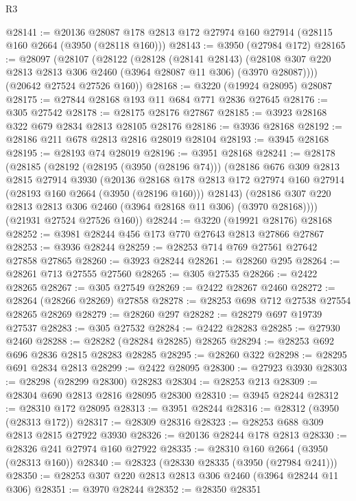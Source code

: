 \begin{lexlean}{R3}
\begin{coremodule}
@28141 := @20136 @28087 @178 @2813 @172 @27974 @160 @27914 (@28115 @160 @2664 (@3950 (@28118 @160)))
@28143 := @3950 (@27984 @172)
@28165 := @28097
    (@28107
      (@28122
        (@28128
          (@28141 @28143)
          (@28108 @307 @220 @2813 @2813 @306 @2460 (@3964 @28087 @11 @306) (@3970 @28087))))
      (@20642 @27524 @27526 @160))
@28168 := @3220 (@19924 @28095) @28087
@28175 := @27844 @28168 @193 @11 @684 @771 @2836 @27645
@28176 := @305 @27542
@28178 := @28175 @28176 @27867
@28185 := @3923 @28168 @322 @679 @2834 @2813 @28105 @28176
@28186 := @3936 @28168
@28192 := @28186 @211 @678 @2813 @2816 @28019 @28104
@28193 := @3945 @28168
@28195 := @28193 @74 @28019
@28196 := @3951 @28168
@28241 := @28178
    (@28185
      (@28192
        (@28195 (@3950 (@28196 @74)))
        (@28186
          @676
          @309
          @2813
          @2815
          @27914
          @3930
          (@20136
            @28168
            @178
            @2813
            @172
            @27974
            @160
            @27914
            (@28193 @160 @2664 (@3950 (@28196 @160)))
            @28143)
          (@28186 @307 @220 @2813 @2813 @306 @2460 (@3964 @28168 @11 @306) (@3970 @28168))))
      (@21931 @27524 @27526 @160))
@28244 := @3220 (@19921 @28176) @28168
@28252 := @3981 @28244 @456 @173 @770 @27643 @2813 @27866 @27867
@28253 := @3936 @28244
@28259 := @28253 @714 @769 @27561 @27642 @27858 @27865
@28260 := @3923 @28244
@28261 := @28260 @295
@28264 := @28261 @713 @27555 @27560
@28265 := @305 @27535
@28266 := @2422 @28265
@28267 := @305 @27549
@28269 := @2422 @28267 @2460
@28272 := @28264 (@28266 @28269) @27858
@28278 := @28253 @698 @712 @27538 @27554 @28265 @28269
@28279 := @28260 @297
@28282 := @28279 @697 @19739 @27537
@28283 := @305 @27532
@28284 := @2422 @28283
@28285 := @27930 @2460
@28288 := @28282 (@28284 @28285) @28265
@28294 := @28253 @692 @696 @2836 @2815 @28283 @28285
@28295 := @28260 @322
@28298 := @28295 @691 @2834 @2813
@28299 := @2422 @28095
@28300 := @27923 @3930
@28303 := @28298 (@28299 @28300) @28283
@28304 := @28253 @213
@28309 := @28304 @690 @2813 @2816 @28095 @28300
@28310 := @3945 @28244
@28312 := @28310 @172 @28095
@28313 := @3951 @28244
@28316 := @28312 (@3950 (@28313 @172))
@28317 := @28309 @28316
@28323 := @28253 @688 @309 @2813 @2815 @27922 @3930
@28326 := @20136 @28244 @178 @2813
@28330 := @28326 @241 @27974 @160 @27922
@28335 := @28310 @160 @2664 (@3950 (@28313 @160))
@28340 := @28323 (@28330 @28335 (@3950 (@27984 @241)))
@28350 := @28253 @307 @220 @2813 @2813 @306 @2460 (@3964 @28244 @11 @306)
@28351 := @3970 @28244
@28352 := @28350 @28351

\end{coremodule}
\end{lexlean}
